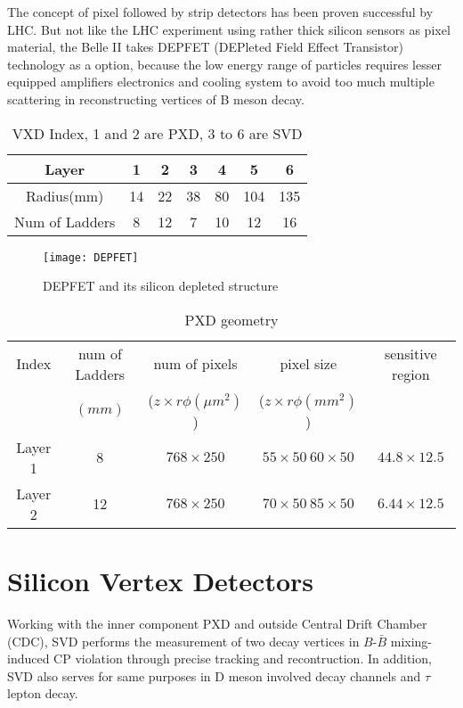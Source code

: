 	The concept of pixel followed by strip detectors has been proven successful by LHC. But not like the LHC experiment using rather thick silicon sensors as pixel material, the Belle II takes DEPFET (DEPleted Field Effect Transistor) technology as a option, because the low energy range of particles requires lesser equipped amplifiers electronics and cooling system to avoid too much multiple scattering in reconstructing vertices of B meson decay. 
	\begin{table}[hbp]
		\centering
		\caption{VXD Index, 1 and 2 are PXD, 3 to 6 are SVD}
		\huge
		\begin{tabular}{c|c|c|c|c|c|c}
			\hline
			Layer & 1 & 2 & 3 & 4 & 5 & 6 \\
			\hline
			Radius(mm) & 14 & 22 & 38 & 80 & 104 & 135 \\
			\hline
			Num of Ladders & 8 & 12 & 7 & 10 & 12 & 16 \\
			\hline
		\end{tabular}
	\end{table}
	\begin{figure}[htbp]
		\centering
		\texttt{[image: DEPFET]}
		\caption{DEPFET and its silicon depleted structure}
	\end{figure}
	\begin{table}[hbp]
		\centering
		\caption{PXD geometry}
		\large
		\begin{tabular}{c|c|c|c|c}
			\hline
			Index & num of Ladders  & num of pixels & pixel size & sensitive region \\
				& $(mm)$ & ($z \times r\phi (\mu m^2)$) & ($z \times r\phi (mm^2)$)\\
			\hline
			Layer 1 & 8 & $768 \times 250$ & $55 \times 50 \ 60\times 50 $ & $44.8\times 12.5$\\
			\hline
			Layer 2 & 12 & $768 \times 250$ & $70 \times 50 \ 85\times 50 $ & $6.44\times 12.5$\\
			\hline
		\end{tabular}
	\end{table}
\section{Silicon Vertex Detectors}
	Working with the inner component PXD and outside Central Drift Chamber (CDC), SVD performs the measurement of two decay vertices in $B\text{-}\bar{B}$ mixing-induced CP violation through precise tracking and recontruction. In addition, SVD also serves for same purposes in D meson involved decay channels and $\tau$lepton decay. 
	
